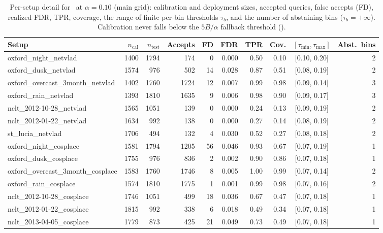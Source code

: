 \begin{table}[t]
\centering
\caption{Per-setup detail for \method\ at $\alpha=0.10$ (main grid): calibration and deployment sizes, accepted queries, false accepts (FD), realized FDR, TPR, coverage, the range of finite per-bin thresholds $\tau_b$, and the number of abstaining bins ($\tau_b=+\infty$). Calibration never falls below the $5B/\alpha$ fallback threshold ().}
\label{tab:per_setup}
\scriptsize
\setlength{\tabcolsep}{4.5pt}
\begin{tabular}{l rr rr r r r c r}
\toprule
Setup & $n_\mathrm{cal}$ & $n_\mathrm{test}$ & Accepts & FD & FDR & TPR & Cov. & $[\tau_{\min},\tau_{\max}]$ & Abst.\ bins \\
\midrule
oxford\_night\_netvlad & 1400 & 1794 & 174 & 0 & 0.000 & 0.50 & 0.10 & [0.10, 0.20] & 2 \\
oxford\_dusk\_netvlad & 1574 & 976 & 502 & 14 & 0.028 & 0.87 & 0.51 & [0.08, 0.19] & 2 \\
oxford\_overcast\_3month\_netvlad & 1402 & 1760 & 1724 & 12 & 0.007 & 0.99 & 0.98 & [0.09, 0.14] & 3 \\
oxford\_rain\_netvlad & 1393 & 1810 & 1635 & 9 & 0.006 & 0.98 & 0.90 & [0.09, 0.17] & 3 \\
nclt\_2012-10-28\_netvlad & 1565 & 1051 & 139 & 0 & 0.000 & 0.24 & 0.13 & [0.09, 0.19] & 2 \\
nclt\_2012-01-22\_netvlad & 1634 & 992 & 138 & 0 & 0.000 & 0.27 & 0.14 & [0.08, 0.19] & 2 \\
st\_lucia\_netvlad & 1706 & 494 & 132 & 4 & 0.030 & 0.52 & 0.27 & [0.08, 0.18] & 2 \\
oxford\_night\_cosplace & 1581 & 1794 & 1205 & 56 & 0.046 & 0.93 & 0.67 & [0.07, 0.19] & 1 \\
oxford\_dusk\_cosplace & 1755 & 976 & 836 & 2 & 0.002 & 0.90 & 0.86 & [0.07, 0.18] & 1 \\
oxford\_overcast\_3month\_cosplace & 1583 & 1760 & 1746 & 8 & 0.005 & 1.00 & 0.99 & [0.07, 0.14] & 2 \\
oxford\_rain\_cosplace & 1574 & 1810 & 1775 & 1 & 0.001 & 0.99 & 0.98 & [0.07, 0.16] & 2 \\
nclt\_2012-10-28\_cosplace & 1746 & 1051 & 499 & 18 & 0.036 & 0.67 & 0.47 & [0.07, 0.18] & 1 \\
nclt\_2012-01-22\_cosplace & 1815 & 992 & 338 & 6 & 0.018 & 0.49 & 0.34 & [0.07, 0.18] & 1 \\
nclt\_2013-04-05\_cosplace & 1779 & 873 & 425 & 21 & 0.049 & 0.73 & 0.49 & [0.07, 0.18] & 1 \\

\end{tabular}
\end{table}

